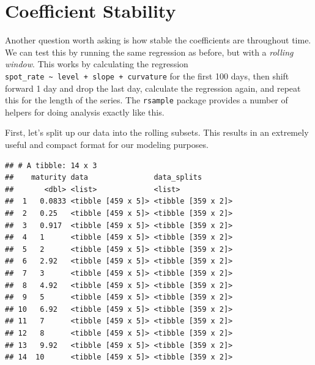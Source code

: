 \documentclass[]{book}
\newenvironment{Shaded}{\begin{snugshade}}{\end{snugshade}}
\newcommand{\CommentTok}[1]{\textcolor[rgb]{0.56,0.35,0.01}{\textit{#1}}}
\newcommand{\DataTypeTok}[1]{\textcolor[rgb]{0.13,0.29,0.53}{#1}}
\newcommand{\DecValTok}[1]{\textcolor[rgb]{0.00,0.00,0.81}{#1}}
\newcommand{\KeywordTok}[1]{\textcolor[rgb]{0.13,0.29,0.53}{\textbf{#1}}}
\newcommand{\NormalTok}[1]{#1}
\newcommand{\OperatorTok}[1]{\textcolor[rgb]{0.81,0.36,0.00}{\textbf{#1}}}
\newcommand{\OtherTok}[1]{\textcolor[rgb]{0.56,0.35,0.01}{#1}}
\newcommand{\StringTok}[1]{\textcolor[rgb]{0.31,0.60,0.02}{#1}}
\theoremstyle{definition}
\theoremstyle{definition}
\theoremstyle{definition}
\theoremstyle{remark}
\begin{document}
\hypertarget{coefficient-stability}{%
\section{Coefficient Stability}\label{coefficient-stability}}

Another question worth asking is how stable the coefficients are
throughout time. We can test this by running the same regression as
before, but with a \emph{rolling window}. This works by calculating the
regression
\texttt{spot\_rate\ \textasciitilde{}\ level\ +\ slope\ +\ curvature}
for the first 100 days, then shift forward 1 day and drop the last day,
calculate the regression again, and repeat this for the length of the
series. The \texttt{rsample} package provides a number of helpers for
doing analysis exactly like this.

First, let's split up our data into the rolling subsets. This results in
an extremely useful and compact format for our modeling purposes.

\begin{Shaded}
\end{Shaded}

\begin{verbatim}
## # A tibble: 14 x 3
##    maturity data               data_splits       
##       <dbl> <list>             <list>            
##  1   0.0833 <tibble [459 x 5]> <tibble [359 x 2]>
##  2   0.25   <tibble [459 x 5]> <tibble [359 x 2]>
##  3   0.917  <tibble [459 x 5]> <tibble [359 x 2]>
##  4   1      <tibble [459 x 5]> <tibble [359 x 2]>
##  5   2      <tibble [459 x 5]> <tibble [359 x 2]>
##  6   2.92   <tibble [459 x 5]> <tibble [359 x 2]>
##  7   3      <tibble [459 x 5]> <tibble [359 x 2]>
##  8   4.92   <tibble [459 x 5]> <tibble [359 x 2]>
##  9   5      <tibble [459 x 5]> <tibble [359 x 2]>
## 10   6.92   <tibble [459 x 5]> <tibble [359 x 2]>
## 11   7      <tibble [459 x 5]> <tibble [359 x 2]>
## 12   8      <tibble [459 x 5]> <tibble [359 x 2]>
## 13   9.92   <tibble [459 x 5]> <tibble [359 x 2]>
## 14  10      <tibble [459 x 5]> <tibble [359 x 2]>
\end{verbatim}
\end{document}
